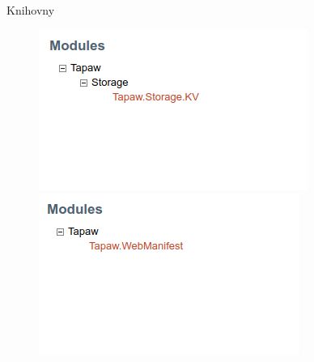 \documentclass[presentation]{beamer}
\begin{document}
\begin{frame}{Knihovny}
  \begin{figure}
    \centering
    \begin{minipage}{.5\textwidth}
      \centering
      \includegraphics[width=.9\linewidth]{img/screen-storage.png}
    \end{minipage}%
    \begin{minipage}{.5\textwidth}
      \centering
      \includegraphics[width=.9\linewidth]{img/screen-webmanifest.png}
    \end{minipage}
  \end{figure}
\end{frame}
\end{document}

